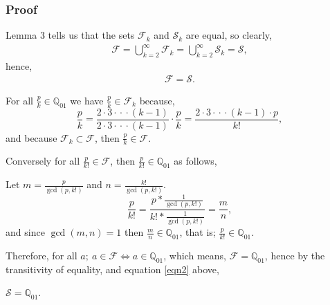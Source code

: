 \documentclass{article}
\begin{document}
\break
\subsubsection*{Proof}

Lemma 3 tells us that the sets
\(\mathcal{F}_k\) and \(\mathcal{S}_k\) are equal, so clearly,
{\small
\begin{gather*}
\mathcal{F} = \bigcup\limits_{k=2}^{\infty} \mathcal{F}_k
= \bigcup\limits_{k=2}^{\infty} \mathcal{S}_k = \mathcal{S},
\end{gather*}
}
hence,
{\small
\begin{gather}
\mathcal{F} = \mathcal{S}. \label{eqn2}
\end{gather}
}

For all \(\frac{p}{k} \in \mathbb{Q}_{01}\) we have
\(\frac{p}{k} \in{} \mathcal{F}_k\) because,
{\small
\bgroup                                  %
\begin{equation*}
\frac{p}{k}
= \frac{2\cdot{}3\cdot{}\cdot{}\cdot{}(k-1)}{2\cdot{}3\cdot{}\cdot{}\cdot{}(k-1)} \cdot{} \frac{p}{k}
= \frac{2\cdot{}3\cdot{}\cdot{}\cdot{}(k-1)\cdot{}p}{k!},
\end{equation*}
\egroup
}
and because \(\mathcal{F}_k \subset \mathcal{F}\), then \(\frac{p}{k} \in \mathcal{F}\).

Conversely for all \(\frac{p}{k!} \in \mathcal{F}\), then \(\frac{p}{k!} \in \mathbb{Q}_{01}\) as follows,

Let \(m = \frac{p}{\gcd(p,k!)}\)
and \(n = \frac{k!}{\gcd(p,k!)}\).
{\small
\bgroup                                  %
\setlength{\abovedisplayskip}{0pt}       %
\begin{equation*}
\frac{p}{k!} = \frac{p*\frac{1}{\gcd(p,k!)}}{k!*\frac{1}{\gcd(p,k!)}} = \frac{m}{n},
\end{equation*}
\egroup
}\newline
and since \(\gcd(m,n) = 1\) then \(\frac{m}{n} \in \mathbb{Q}_{01}\), that is; \(\frac{p}{k!} \in \mathbb{Q}_{01}\).

Therefore, for all \(a;\ a \in \mathcal{F} \Leftrightarrow a \in \mathbb{Q}_{01}\), which means,
\(\mathcal{F} = \mathbb{Q}_{01}\),
hence by the transitivity of equality, and equation \eqref{eqn2} above,

\begin{center}
\(\mathcal{S} = \mathbb{Q}_{01}\).
\end{center}
\end{document}

